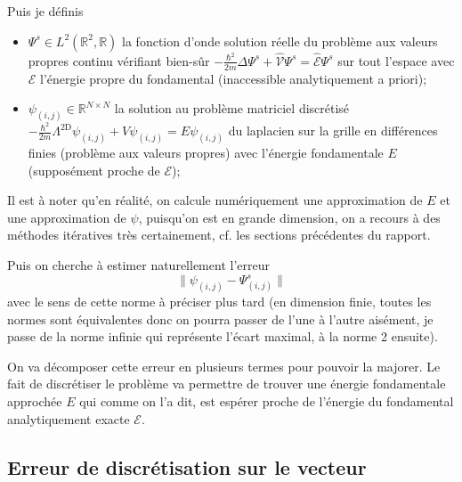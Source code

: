 \documentclass[svgnames,dvipsnames,a4paper,10pt,french]{report}
\begin{document}
\begin{appendices}
Puis je définis
\begin{itemize}
    \item $\Psi^s \in L^2(\mathbb{R}^2,\mathbb{R})$ la fonction d'onde solution réelle du problème aux valeurs propres continu vérifiant bien-sûr $-\frac{\hbar^2}{2m} \Delta \Psi^s + \hat{\mathcal{V}}\Psi^s = \hat{\mathcal{E}}\Psi^s$ sur tout l'espace avec $\mathcal{E}$ l'énergie propre du fondamental (inaccessible analytiquement a priori);
    
    \item $\psi_{(i,j)} \in \mathbb{R}^{N\times N}$ la solution  au problème matriciel discrétisé $-\frac{\hbar^2}{2m}\Lambda^\text{2D} \psi_{(i,j)} + V \psi_{(i,j)} = E \psi_{(i,j)}$ du laplacien sur la grille en différences finies (problème aux valeurs propres) avec l'énergie fondamentale $E$ (supposément proche de $\mathcal{E}$);
\end{itemize}

Il est à noter qu'en réalité, on calcule numériquement une approximation de $E$ et une approximation de $\psi$, puisqu'on est en grande dimension, on a recours à des méthodes itératives très certainement, cf. les sections précédentes du rapport.



Puis on cherche à estimer naturellement l'erreur
\begin{equation}
     \|\psi_{(i,j)}-\Psi^s_{(i,j)}\|
\end{equation}
avec le sens de cette norme à préciser plus tard (en dimension finie, toutes les normes sont équivalentes donc on pourra passer de l'une à l'autre aisément, je passe de la norme infinie qui représente l'écart maximal, à la norme 2 ensuite).

On va décomposer cette erreur en plusieurs termes pour pouvoir la majorer. Le fait de discrétiser le problème va permettre de trouver une énergie fondamentale approchée $E$ qui comme on l'a dit, est espérer proche de l'énergie du fondamental analytiquement exacte $\mathcal{E}$.  


\subsection{Erreur de discrétisation sur le vecteur}


\end{appendices}
\end{document}
